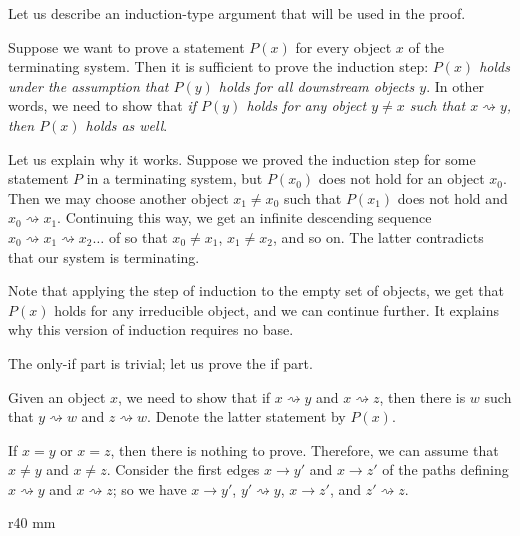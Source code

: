 Let us describe an induction-type argument that will be used in the proof.

Suppose we want to prove a statement $P(x)$ for every object $x$ of the terminating system.
Then it is sufficient to prove the induction step:
\textit{$P(x)$ holds under the assumption that $P(y)$ holds for all downstream objects $y$}.
In other words, we need to show that \textit{if $P(y)$ holds for any object $y\ne x$ such that $x\rightsquigarrow y$, then $P(x)$ holds as well}.

Let us explain why it works.
Suppose we proved the induction step for some statement $P$ in a terminating system, but $P(x_0)$ does not hold for an object $x_0$.
Then we may choose another object $x_1\ne x_0$ such that $P(x_1)$ does not hold and $x_0\rightsquigarrow x_1$.
Continuing this way, we get an infinite descending sequence $x_0\rightsquigarrow x_1\rightsquigarrow x_2\dots$ of so that $x_0\ne x_1$, $x_1\ne x_2$, and so on.
The latter contradicts that our system is terminating.

Note that applying the step of induction to the empty set of objects,
we get that $P(x)$ holds for any irreducible object, and we can continue further.
It explains why this version of induction requires no base.

The only-if part is trivial;
let us prove the if part.

Given an object $x$, we need to show that if $x\rightsquigarrow y$ and $x\rightsquigarrow  z$, then there is $w$ such that $y\rightsquigarrow w$ and $z\rightsquigarrow  w$.
Denote the latter statement by $P(x)$.

If $x=y$ or $x=z$, then there is nothing to prove.
Therefore, we can assume that $x\ne y$ and $x\ne z$.
Consider the first edges $x\to y'$ and $x \to z'$ of the paths defining $x\rightsquigarrow y$ and $x\rightsquigarrow  z$; 
so we have $x\to y'$, $y' \rightsquigarrow  y$, $x \to z'$, and $z' \rightsquigarrow  z$.

\begin{wrapfigure}[9]{r}{40 mm}
\vskip-6mm
\centering
{}
\vskip-0mm
\end{wrapfigure}

